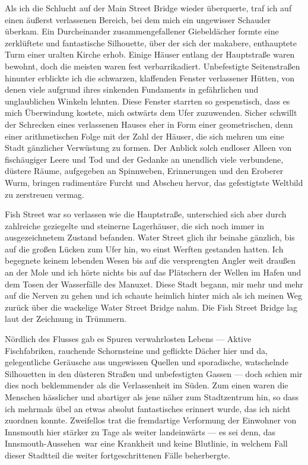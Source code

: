 Als ich die Schlucht auf der Main Street Bridge wieder überquerte, traf ich auf einen äußerst verlassenen Bereich, bei dem mich ein ungewisser Schauder überkam. Ein Durcheinander zusammengefallener Giebeldächer formte eine zerklüftete und fantastische Silhouette, über der sich der makabere, enthauptete Turm einer uralten Kirche erhob. Einige Häuser entlang der Hauptstraße waren bewohnt, doch die meisten waren fest verbarrikadiert. Unbefestigte Seitenstraßen hinunter erblickte ich die schwarzen, klaffenden Fenster verlassener Hütten, von denen viele aufgrund ihres sinkenden Fundaments in gefährlichen und unglaublichen Winkeln lehnten.
Diese Fenster starrten so gespenstisch, dass es mich Überwindung kostete, mich ostwärts dem Ufer zuzuwenden. Sicher schwillt der Schrecken eines verlassenen Hauses eher in Form einer geometrischen, denn einer arithmetischen Folge mit der Zahl der Häuser, die sich mehren um eine Stadt gänzlicher Verwüstung zu formen. Der Anblick solch endloser Alleen von fischäugiger Leere und Tod und der Gedanke an unendlich viele verbundene, düstere Räume, aufgegeben an Spinnweben, Erinnerungen und den Eroberer Wurm, bringen rudimentäre Furcht und Abscheu hervor, das gefestigtste Weltbild zu zerstreuen vermag.

Fish Street war so verlassen wie die Hauptstraße, unterschied sich aber durch zahlreiche geziegelte und steinerne Lagerhäuser, die sich noch immer in ausgezeichnetem Zustand befanden. Water Street glich ihr beinahe gänzlich, bis auf die großen Lücken zum Ufer hin, wo einst Werften gestanden hatten. Ich begegnete keinem lebenden Wesen bis auf die versprengten Angler weit draußen an der Mole und ich hörte nichts bis auf das Plätschern der Wellen im Hafen und dem Tosen der Wasserfälle des Manuxet. Diese Stadt begann, mir mehr und mehr auf die Nerven zu gehen und ich schaute heimlich hinter mich als ich meinen Weg zurück über die wackelige Water Street Bridge nahm. Die Fish Street Bridge lag laut der Zeichnung in Trümmern.

Nördlich des Flusses gab es Spuren verwahrlosten Lebens --- Aktive Fischfabriken, rauchende Schornsteine und geflickte Dächer hier und da, gelegentliche Geräusche aus ungewissen Quellen und sporadische, watschelnde Silhouetten in den düsteren Straßen und unbefestigten Gassen --- doch schien mir dies noch beklemmender als die Verlassenheit im Süden. Zum einen waren die Menschen hässlicher und abartiger als jene näher zum Stadtzentrum hin, so dass ich mehrmals übel an etwas absolut fantastisches erinnert wurde, das ich nicht zuordnen konnte. Zweifellos trat die fremdartige Verformung der Einwohner von Innsmouth hier stärker zu Tage als weiter landeinwärts --- es sei denn, das \glqq Innsmouth-Aussehen\grqq\ war eine Krankheit und keine Blutlinie, in welchem Fall dieser Stadtteil die weiter fortgeschrittenen Fälle beherbergte.

